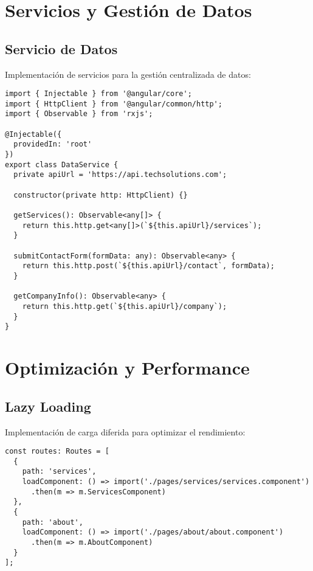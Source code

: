 \section{Servicios y Gestión de Datos}

\subsection{Servicio de Datos}

Implementación de servicios para la gestión centralizada de datos:

\begin{lstlisting}[caption=Data Service]
import { Injectable } from '@angular/core';
import { HttpClient } from '@angular/common/http';
import { Observable } from 'rxjs';

@Injectable({
  providedIn: 'root'
})
export class DataService {
  private apiUrl = 'https://api.techsolutions.com';

  constructor(private http: HttpClient) {}

  getServices(): Observable<any[]> {
    return this.http.get<any[]>(`${this.apiUrl}/services`);
  }

  submitContactForm(formData: any): Observable<any> {
    return this.http.post(`${this.apiUrl}/contact`, formData);
  }

  getCompanyInfo(): Observable<any> {
    return this.http.get(`${this.apiUrl}/company`);
  }
}
\end{lstlisting}

\section{Optimización y Performance}

\subsection{Lazy Loading}

Implementación de carga diferida para optimizar el rendimiento:

\begin{lstlisting}[caption=Lazy Loading Routes]
const routes: Routes = [
  { 
    path: 'services', 
    loadComponent: () => import('./pages/services/services.component')
      .then(m => m.ServicesComponent) 
  },
  { 
    path: 'about', 
    loadComponent: () => import('./pages/about/about.component')
      .then(m => m.AboutComponent) 
  }
];
\end{lstlisting}

